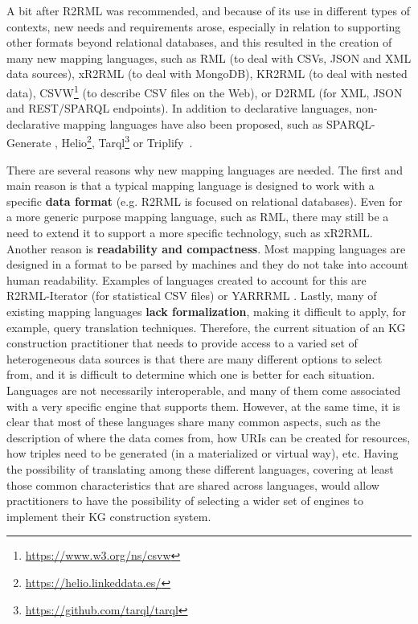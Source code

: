 A bit after R2RML was recommended, and because of its use in different types of contexts, new needs and requirements arose, especially in relation to supporting other formats beyond relational databases, and this resulted in the creation of many new mapping languages, such as RML \citep{dimou2014rml} (to deal with CSVs, JSON and XML data sources), xR2RML \citep{michel2015translation} (to deal with MongoDB), KR2RML \citep{slepicka2015kr2rml} (to deal with nested data), CSVW\footnote{\url{https://www.w3.org/ns/csvw}} (to describe CSV files on the Web), or D2RML \citep{chortaras2018d2rml} (for XML, JSON and REST/SPARQL endpoints). In addition to declarative languages, non-declarative mapping languages have also been proposed, such as SPARQL-Generate \citep{lefranccois2017sparql}, Helio\footnote{\url{https://helio.linkeddata.es/}},  Tarql\footnote{\url{https://github.com/tarql/tarql}} or Triplify~\citep{auer2009triplify}.

There are several reasons why new mapping languages are needed. The first and main reason is that a typical mapping language is designed to work with a specific \textbf{data format} (e.g. R2RML is focused on relational databases). Even for a more generic purpose mapping language, such as RML, there may still be a need to extend it to support a more specific technology, such as xR2RML. Another reason is \textbf{readability and compactness}. Most mapping languages are designed in a format to be parsed by machines and they do not take into account human readability. Examples of languages created to account for this are R2RML-Iterator (for statistical CSV files) \citep{chaves2018virtual} or YARRRML \citep{Heyvaert2018Declarative}. Lastly, many of existing mapping languages \textbf{lack formalization}, making it difficult to apply, for example, query translation techniques. 
Therefore, the current situation of an KG construction practitioner that needs to provide access to a varied set of heterogeneous data sources is that there are many different options to select from, and it is difficult to determine which one is better for each situation. Languages are not necessarily interoperable, and many of them come associated with a very specific engine that supports them. However, at the same time, it is clear that most of these languages share many common aspects, such as the description of where the data comes from, how URIs can be created for resources, how triples need to be generated (in a materialized or virtual way), etc. Having the possibility of translating among these different languages, covering at least those common characteristics that are shared across languages, would allow practitioners to have the possibility of selecting a wider set of engines to implement their KG construction system.

